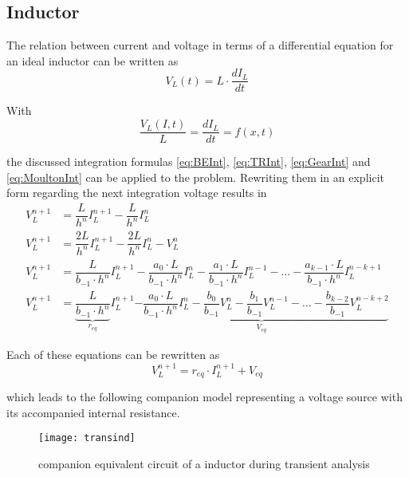 \subsection{Inductor}

The relation between current and voltage in terms of a differential
equation for an ideal inductor can be written as
\begin{equation}
V_L(t) = L\cdot \dfrac{d I_L}{d t}
\end{equation}

With
\begin{equation}
\dfrac{V_L(I, t)}{L} = \dfrac{d I_L}{d t} = f(x,t)
\end{equation}

the discussed integration formulas \eqref{eq:BEInt}, \eqref{eq:TRInt},
\eqref{eq:GearInt} and \eqref{eq:MoultonInt} can be applied to the
problem.  Rewriting them in an explicit form regarding the next
integration voltage results in
\begin{align}
V_L^{n+1} &= \dfrac{L}{h^{n}} I_L^{n+1} - \dfrac{L}{h^{n}} I_L^{n}\\
V_L^{n+1} &= \dfrac{2L}{h^{n}} I_L^{n+1} - \dfrac{2L}{h^{n}} I_L^{n} - V_L^n\\
V_L^{n+1} &= \dfrac{L}{b_{-1}\cdot h^{n}} I_L^{n+1} - \dfrac{a_0\cdot L}{b_{-1}\cdot h^{n}} I_L^{n} - \dfrac{a_1\cdot L}{b_{-1}\cdot h^{n}} I_L^{n-1} - \ldots - \dfrac{a_{k-1}\cdot L}{b_{-1}\cdot h^{n}} I_L^{n-k+1}\\
V_L^{n+1} &= \underbrace{\dfrac{L}{b_{-1}\cdot h^{n}}}_{r_{eq}} I_L^{n+1} \underbrace{- \dfrac{a_0\cdot L}{b_{-1}\cdot h^{n}} I_L^{n} - \dfrac{b_0}{b_{-1}} V_L^n - \dfrac{b_1}{b_{-1}} V_L^{n-1} - \ldots - \dfrac{b_{k-2}}{b_{-1}} V_L^{n-k+2}}_{V_{eq}}
\end{align}

Each of these equations can be rewritten as
\begin{equation}
V_L^{n+1} = r_{eq}\cdot I_L^{n+1} + V_{eq}
\end{equation}

which leads to the following companion model representing a voltage
source with its accompanied internal resistance.
\begin{figure}[ht]
\begin{center}
\texttt{[image: transind]}
\end{center}
\caption{companion equivalent circuit of a inductor during transient analysis}
\end{figure}
\FloatBarrier

